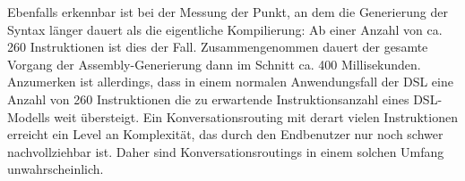 \newline
Ebenfalls erkennbar ist bei der Messung der Punkt, an dem die Generierung der Syntax länger dauert als die eigentliche Kompilierung: Ab einer Anzahl von ca. 260 Instruktionen ist dies der Fall.  Zusammengenommen dauert der gesamte Vorgang der Assembly-Generierung dann im Schnitt ca. 400 Millisekunden. Anzumerken ist allerdings, dass in einem normalen Anwendungsfall der DSL eine Anzahl von 260 Instruktionen die zu erwartende Instruktionsanzahl eines DSL-Modells weit übersteigt. Ein Konversationsrouting mit derart vielen Instruktionen erreicht ein Level an Komplexität, das durch den Endbenutzer nur noch schwer nachvollziehbar ist. Daher sind Konversationsroutings in einem solchen Umfang unwahrscheinlich.  
